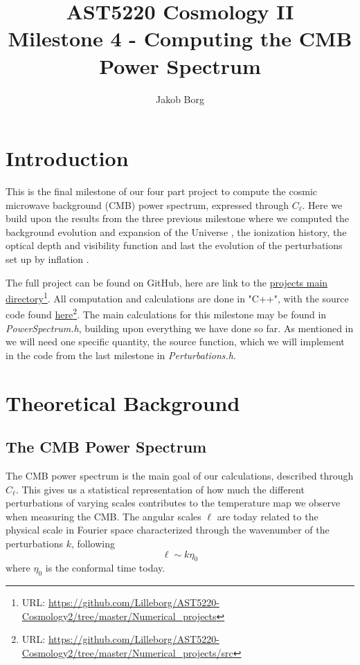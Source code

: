 \documentclass[10pt,a4paper]{article}
\title{AST5220 Cosmology \rm{II}\\ 
\vspace{5mm}Milestone 4 - Computing the CMB Power Spectrum}
\author{Jakob Borg}
\begin{document}
\maketitle
{}

\section{Introduction}
\label{sec:Introduction}
This is the final milestone of our four part project to compute the cosmic microwave background (CMB) power spectrum, expressed through $C_\ell$. Here we build upon the results from the three previous milestone where we computed the background evolution and expansion of the Universe \citep{milestone1}, the ionization history, the optical depth and visibility function \citep{milestone2} and last the evolution of the perturbations set up by inflation \citep{milestone3}.


The full project can be found on GitHub, here are link to the \href{https://github.com/Lilleborg/AST5220-Cosmology2/tree/master/Numerical_projects}{projects main directory}\footnote{URL: \url{https://github.com/Lilleborg/AST5220-Cosmology2/tree/master/Numerical_projects}}. All computation and calculations are done in "C++", with the source code found \href{https://github.com/Lilleborg/AST5220-Cosmology2/tree/master/Numerical_projects/src}{here}\footnote{URL: \url{https://github.com/Lilleborg/AST5220-Cosmology2/tree/master/Numerical_projects/src}}. 
The main calculations for this milestone may be found in \textit{PowerSpectrum.h}, building upon everything we have done so far. As mentioned in \cite{milestone3} we will need one specific quantity, the source function, which we will implement in the code from the last milestone in \textit{Perturbations.h}.


\section{Theoretical Background}
\label{sec:Theory}

\subsection{The CMB Power Spectrum}
\label{subsec:Theory/CMB power spectrum}
The CMB power spectrum is the main goal of our calculations, described through $C_\ell$. This gives us a statistical representation of how much the different perturbations of varying scales contributes to the temperature map we observe when measuring the CMB. The angular scales $\ell$ are today related to the physical scale in Fourier space characterized through the wavenumber of the perturbations $k$, following
\begin{equation*}
  \ell \sim k \eta_0
\end{equation*}
where $\eta_0$ is the conformal time today.
\end{document}
